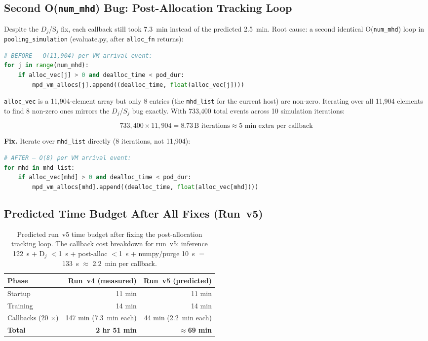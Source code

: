\documentclass[11pt]{article}
\begin{document}
\subsection{Second O(\texttt{num\_mhd}) Bug: Post-Allocation Tracking Loop}

Despite the $D_j$/S$_j$ fix, each callback still took 7.3~min instead of
the predicted 2.5~min. Root cause: a second identical O(\texttt{num\_mhd})
loop in \texttt{pooling\_simulation} (evaluate.py, after \texttt{alloc\_fn}
returns):

\begin{lstlisting}[language=Python]
# BEFORE — O(11,904) per VM arrival event:
for j in range(num_mhd):
    if alloc_vec[j] > 0 and dealloc_time < pod_dur:
        mpd_vm_allocs[j].append((dealloc_time, float(alloc_vec[j])))
\end{lstlisting}

\texttt{alloc\_vec} is a 11,904-element array but only 8 entries
(the \texttt{mhd\_list} for the current host) are non-zero.
Iterating over all 11,904 elements to find 8 non-zero ones mirrors the
$D_j$/$S_j$ bug exactly.
With 733,400 total events across 10 simulation iterations:

\[
733{,}400 \times 11{,}904 = 8.73\,\text{B iterations} \approx 5\text{ min extra per callback}
\]

\textbf{Fix.} Iterate over \texttt{mhd\_list} directly (8 iterations, not 11,904):

\begin{lstlisting}[language=Python]
# AFTER — O(8) per VM arrival event:
for mhd in mhd_list:
    if alloc_vec[mhd] > 0 and dealloc_time < pod_dur:
        mpd_vm_allocs[mhd].append((dealloc_time, float(alloc_vec[mhd])))
\end{lstlisting}

\subsection{Predicted Time Budget After All Fixes (Run~v5)}

\begin{table}[h]
\centering
\begin{tabular}{lrr}
\toprule
Phase & Run~v4 (measured) & Run~v5 (predicted) \\
\midrule
Startup                  & 11 min  & 11 min \\
Training                 & 14 min  & 14 min \\
Callbacks (20 $\times$)  & 147 min (7.3~min each) & 44 min (2.2~min each) \\
\midrule
\textbf{Total}           & \textbf{2 hr 51 min}   & \textbf{$\approx$69 min} \\
\bottomrule
\end{tabular}
\caption{Predicted run~v5 time budget after fixing the post-allocation tracking loop.
The callback cost breakdown for run~v5: inference 122~s + D$_j$ $<$1~s +
post-alloc $<$1~s + numpy/purge 10~s $=$ 133~s $\approx$ 2.2~min per callback.}
\end{table}
\end{document}
